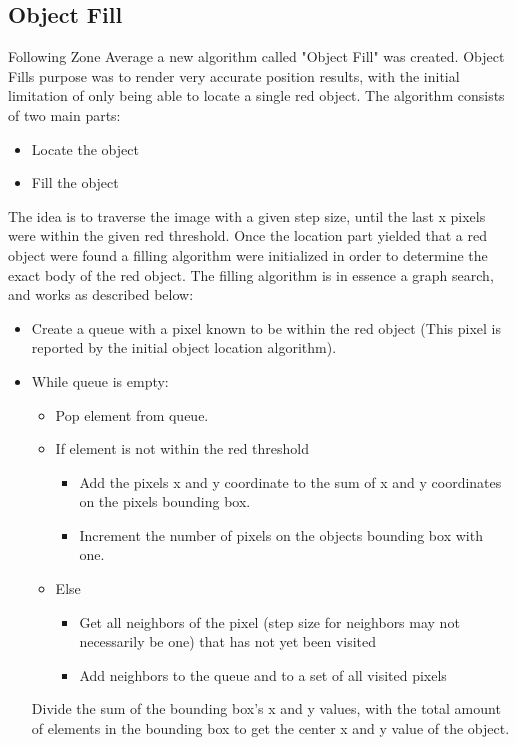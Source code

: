 \subsection{Object Fill}
Following Zone Average a new algorithm called "Object Fill" was created.
Object Fills purpose was to render very accurate position results, with the initial limitation of only being able to locate a single red object.
The algorithm consists of two main parts:
\begin{itemize}
	\item Locate the object
	\item Fill the object
\end{itemize}
The idea is to traverse the image with a given step size, until the last x pixels were within the given red threshold.
Once the location part yielded that a red object were found a filling algorithm were initialized in order to determine the exact body of the red object.
The filling algorithm is in essence a graph search, and works as described below:
\begin{itemize}
	\item Create a queue with a pixel known to be within the red object (This pixel is reported by the initial object location algorithm).
	\item While queue is empty:
	\begin{itemize}
		\item Pop element from queue.
		\item If element is not within the red threshold
		\begin{itemize}
			\item Add the pixels x and y coordinate to the sum of x and y coordinates on the pixels bounding box.
			\item Increment the number of pixels on the objects bounding box with one.
		\end{itemize}
		\item Else
		\begin{itemize}
			\item Get all neighbors of the pixel (step size for neighbors may not necessarily be one) that has not yet been visited
			\item Add neighbors to the queue and to a set of all visited pixels
		\end{itemize}
	\end{itemize}
	Divide the sum of the bounding box's x and y values, with the total amount of elements in the bounding box to get the center x and y value of the object.
\end{itemize}

